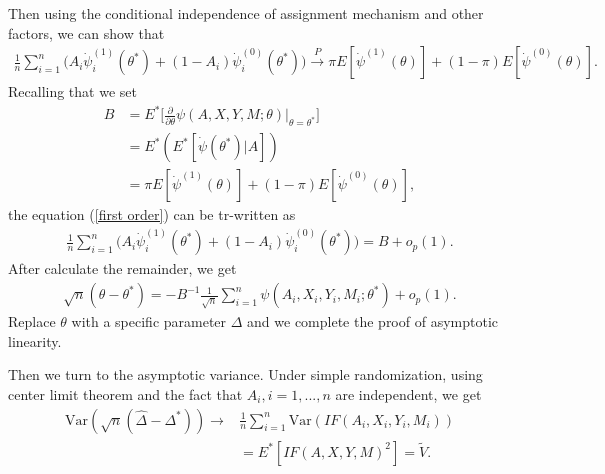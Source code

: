 \documentclass{article}
\begin{document}
Then using the conditional independence of assignment mechanism and other factors, we can show that
\begin{align}\label{first order}
    \frac{1}{n}\sum_{i=1}^n \big(A_i \dot\psi_{i}^{(1)}(\theta^*)+(1-A_i)\dot\psi_{i}^{(0)}(\theta^*)\big) \stackrel{P}{\rightarrow}\pi E[\dot\psi^{(1)}(\theta)]+(1-\pi)E[\dot\psi^{(0)}(\theta)].
\end{align}
Recalling that we set
\begin{align}
    B&=E^{*}\Big[\frac{\partial}{\partial\theta}\psi(A,X,Y,M;\theta)\Big|_{\theta=\theta^*}\Big]\nonumber\\
    &=E^{*}(E^{*}[\dot\psi(\theta^*)|A])\nonumber\\
    &=\pi E[\dot\psi^{(1)}(\theta)]+(1-\pi)E[\dot\psi^{(0)}(\theta)]\nonumber,
\end{align}
the equation (\ref{first order}) can be tr-written as
\begin{align}
    \frac{1}{n}\sum_{i=1}^n \big(A_i \dot\psi_{i}^{(1)}(\theta^*)+(1-A_i)\dot\psi_{i}^{(0)}(\theta^*)\big) = B+o_p(1)\nonumber.
\end{align}
After calculate the remainder, we get \begin{align}
    \sqrt{n}(\hat{\theta}-\theta^*)=-B^{-1}\frac{1}{\sqrt{n}}\sum_{i=1}^n \psi(A_i,X_i,Y_i,M_i;\theta^*)+o_p(1)\nonumber.
\end{align}
Replace $\theta$ with a specific parameter $\Delta$ and we complete the proof of asymptotic linearity.

Then we turn to the asymptotic variance. Under simple randomization, using center limit theorem and the fact that $A_i, i=1,...,n$ are independent, we get
\begin{align}
    \mathrm{Var}(\sqrt{n}(\hat{\Delta}-\Delta^*))\rightarrow&\frac{1}{n}\sum_{i=1}^n \mathrm{Var}(IF(A_i,X_i,Y_i,M_i))\nonumber\\
    &=E^{*}[IF(A,X,Y,M)^2]=\widetilde{V}.\nonumber
\end{align}
\end{document}
